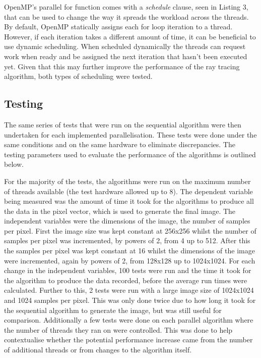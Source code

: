\documentclass[journal,transmag]{IEEEtran}
\begin{document}
	OpenMP's parallel for function comes with a \textit{schedule} clause, seen in Listing 3, that can be used to change the way it spreads the workload across the threads. By default, OpenMP statically assigns each for loop iteration to a thread. However, if each iteration takes a different amount of time, it can be beneficial to use dynamic scheduling. When scheduled dynamically the threads can request work when ready and be assigned the next iteration that hasn't been executed yet. Given that this may further improve the performance of the ray tracing algorithm, both types of scheduling were tested.
	
	\subsection{Testing}
	The same series of tests that were run on the sequential algorithm were then undertaken for each implemented parallelisation. These tests were done under the same conditions and on the same hardware to eliminate discrepancies. The testing parameters used to evaluate the performance of the algorithms is outlined below.
	
	For the majority of the tests, the algorithms were run on the maximum number of threads available (the test hardware allowed up to 8). The dependent variable being measured was the amount of time it took for the algorithms to produce all the data in the pixel vector, which is used to generate the final image. The independent variables were the dimensions of the image, the number of samples per pixel. First the image size was kept constant at 256x256 whilst the number of samples per pixel was incremented, by powers of 2, from 4 up to 512. After this the samples per pixel was kept constant at 16 whilst the dimensions of the image were incremented, again by powers of 2, from 128x128 up to 1024x1024. For each change in the independent variables, 100 tests were run and the time it took for the algorithm to produce the data recorded, before the average run times were calculated. Further to this, 2 tests were run with a large image size of 1024x1024 and 1024 samples per pixel. This was only done twice due to how long it took for the sequential algorithm to generate the image, but was still useful for comparison. Additionally a few tests were done on each parallel algorithm where the number of threads they ran on were controlled. This was done to help contextualise whether the potential performance increase came from the number of additional threads or from changes to the algorithm itself.
	
\end{document}

